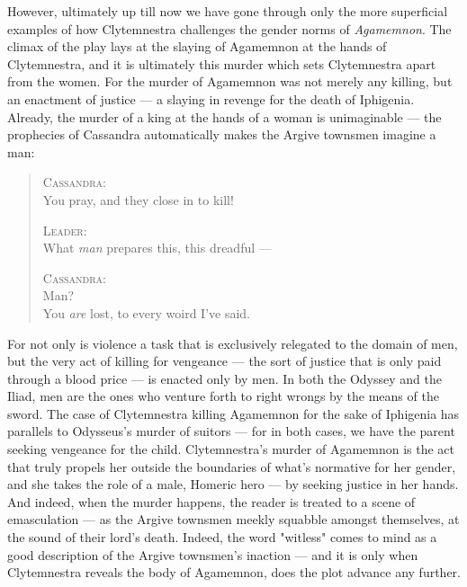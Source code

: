 However, ultimately up till now we have gone through only the more superficial
examples of how Clytemnestra challenges the gender norms of \emph{Agamemnon}.
The climax of the play lays at the slaying of Agamemnon at the hands of
Clytemnestra, and it is ultimately this murder which sets Clytemnestra apart
from the women. For the murder of Agamemnon was not merely any killing, but an
enactment of justice --- a slaying in revenge for the death of Iphigenia.
Already, the murder of a king at the hands of a woman is unimaginable --- the
prophecies of Cassandra automatically makes the Argive townsmen imagine a man:

\begin{quote}
  \textsc{Cassandra}: \\
  You pray, and they close in to kill!

  \textsc{Leader}: \\
  What \emph{man} prepares this, this dreadful ---

  \textsc{Cassandra}: \\
  Man? \\
  You \emph{are} lost, to every woird I've said.

  \autocite[1262]{fagles}
\end{quote}

\noindent
For not only is violence a task that is exclusively relegated to the domain of
men, but the very act of killing for vengeance --- the sort of justice that is
only paid through a blood price --- is enacted only by men. In both the Odyssey
and the Iliad, men are the ones who venture forth to right wrongs by the means
of the sword. The case of Clytemnestra killing Agamemnon for the sake of
Iphigenia has parallels to Odysseus's murder of suitors --- for in both cases,
we have the parent seeking vengeance for the child. Clytemnestra's murder of
Agamemnon is the act that truly propels her outside the boundaries of what's
normative for her gender, and she takes the role of a male, Homeric hero --- by
seeking justice in her hands. And indeed, when the murder happens, the reader
is treated to a scene of emasculation --- as the Argive townsmen meekly squabble
amongst themselves, at the sound of their lord's death. Indeed, the word
"witless" comes to mind as a good description of the Argive townsmen's inaction
--- and it is only when Clytemnestra reveals the body of Agamemnon, does the
plot advance any further.
